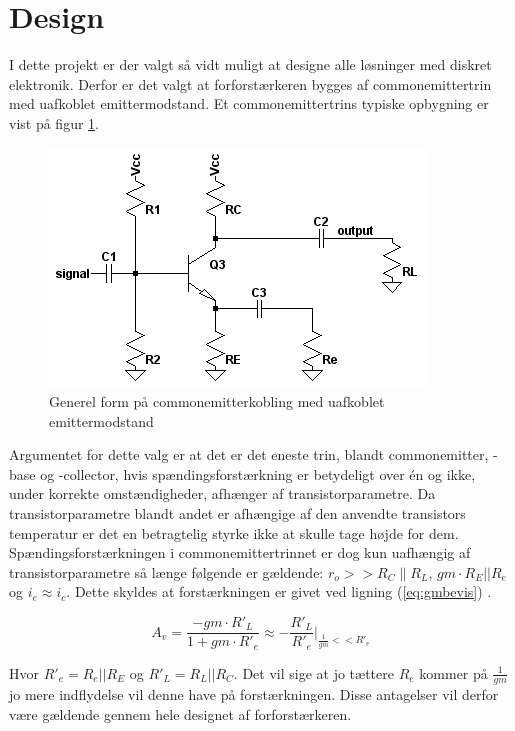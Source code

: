 \section{Design}
I dette projekt er der valgt så vidt muligt at designe alle løsninger med diskret elektronik. Derfor er det valgt at forforstærkeren bygges af commonemittertrin med uafkoblet emittermodstand. Et commonemittertrins typiske opbygning er vist på figur \ref{fig:cekobling}.

\begin{figure}[h]
\centering
\includegraphics[scale=.6]{teknisk/forforstaerker/ceopkobling.png}
\caption{Generel form på commonemitterkobling med uafkoblet emittermodstand}
\label{fig:cekobling}
\end{figure}


Argumentet for dette valg er at det er det eneste trin, blandt commonemitter, -base og -collector, hvis spændingsforstærkning er betydeligt over én og ikke, under korrekte omstændigheder, afhænger af transistorparametre. Da transistorparametre blandt andet er afhængige af den anvendte transistors temperatur er det en betragtelig styrke ikke at skulle tage højde for dem. Spændingsforstærkningen i commonemittertrinnet er dog kun uafhængig af transistorparametre så længe følgende er gældende: $r_o >>R_C \| R_L$, $gm \cdot R_E||R_e$ og $i_e \approx i_c$.
Dette skyldes at forstærkningen er givet ved ligning (\ref{eq:gmbevis}) \cite{ael-mm6}.

\begin{equation}
A_v =  \frac{-gm \cdot R'_L}{1+gm \cdot R'_e} \approx  -\frac{R'_L}{R'_e} \Biggr\vert _{\frac{1}{gm}<<R'_e}
\label{eq:gmbevis}
\end{equation}

Hvor $R'_e = R_e || R_E$ og $R'_L = R_L||R_C$. Det vil sige at jo tættere $R_e$ kommer på $\frac{1}{gm}$ jo mere indflydelse vil denne have på forstærkningen. Disse antagelser vil derfor være gældende gennem hele designet af forforstærkeren. 


